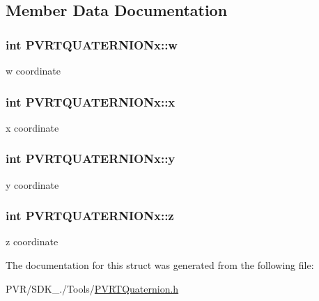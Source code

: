 \subsection{Member Data Documentation}
\hypertarget{struct_p_v_r_t_q_u_a_t_e_r_n_i_o_nx_af6943db18421e74d91f9abf6de235507}{
\subsubsection[{w}]{\setlength{\rightskip}{0pt plus 5cm}int P\+V\+R\+T\+Q\+U\+A\+T\+E\+R\+N\+I\+O\+Nx\+::w}}\label{struct_p_v_r_t_q_u_a_t_e_r_n_i_o_nx_af6943db18421e74d91f9abf6de235507}
w coordinate \hypertarget{struct_p_v_r_t_q_u_a_t_e_r_n_i_o_nx_af3450d5759032c0a58d958f8ab855512}{
\subsubsection[{x}]{\setlength{\rightskip}{0pt plus 5cm}int P\+V\+R\+T\+Q\+U\+A\+T\+E\+R\+N\+I\+O\+Nx\+::x}}\label{struct_p_v_r_t_q_u_a_t_e_r_n_i_o_nx_af3450d5759032c0a58d958f8ab855512}
x coordinate \hypertarget{struct_p_v_r_t_q_u_a_t_e_r_n_i_o_nx_a58e6084d1feeefad2f2348d0d1070afc}{
\subsubsection[{y}]{\setlength{\rightskip}{0pt plus 5cm}int P\+V\+R\+T\+Q\+U\+A\+T\+E\+R\+N\+I\+O\+Nx\+::y}}\label{struct_p_v_r_t_q_u_a_t_e_r_n_i_o_nx_a58e6084d1feeefad2f2348d0d1070afc}
y coordinate \hypertarget{struct_p_v_r_t_q_u_a_t_e_r_n_i_o_nx_af011f90cdefb40164d85c19be4c193ae}{
\subsubsection[{z}]{\setlength{\rightskip}{0pt plus 5cm}int P\+V\+R\+T\+Q\+U\+A\+T\+E\+R\+N\+I\+O\+Nx\+::z}}\label{struct_p_v_r_t_q_u_a_t_e_r_n_i_o_nx_af011f90cdefb40164d85c19be4c193ae}
z coordinate 

The documentation for this struct was generated from the following file\+:\begin{DoxyCompactItemize}
\item 
P\+V\+R/\+S\+D\+K\+\_./\+Tools/\hyperlink{_p_v_r_t_quaternion_8h}{P\+V\+R\+T\+Quaternion.\+h}\end{DoxyCompactItemize}
